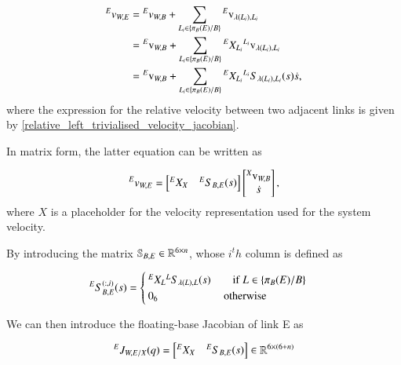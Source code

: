 \begin{equation}
    \begin{split}
        {}^{E}{v}_{W,E} &= {}^{E}{v}_{W,B} + \sum_{L_i \in \{\pi_B(E)/B\}} {}^{E}{\text{v}}_{\lambda(L_i), L_i}\\
        &= {}^{E}{\text{v}}_{W,B} + \sum_{L_i \in \{\pi_B(E)/B\}} {}^{E}{X}_{L_i}{}^{L_i}{\text{v}}_{\lambda(L_i), L_i}\\
        &= {}^{E}{\text{v}}_{W,B} + \sum_{L_i \in \{\pi_B(E)/B\}} {}^{E}{X}_{L_i}{}^{L_i}{S}_{\lambda(L_i), L_i}(s)\dot{s},
    \end{split}
\end{equation}
where the expression for the relative velocity between two adjacent links is given by \ref{relative_left_trivialised_velocity_jacobian}.

In matrix form, the latter equation can be written as

\begin{equation}\label{velocity_link_world_frame_matrix}
    {}^{E}{v}_{W,E} =
    \begin{bmatrix}
        {}^{E}{X}_{X} & {}^{E}{S}_{B,E}(s)
    \end{bmatrix}
    \begin{bmatrix}
        {}^{X}{\text{v}}_{W,B}\\
        \dot{s}
    \end{bmatrix},
\end{equation}
where $X$ is a placeholder for the velocity representation used for the system velocity.

By introducing the matrix $\mathbb{S}_{B,E}\in \mathbb{R}^{6\times n}$, whose $i^th$ column is defined as

\begin{equation}\label{joint_motion_subspace_matrix}
    {}^{E}{S}_{B,E}^{(:,i)}(s) =
    \begin{cases}
        {}^{E}{X}_{L}{}^{L}{S}_{\lambda(L),L}(s) \qquad\text{if}\;L\in \{ \pi_B(E)/B \}\\
        0_6\qquad\qquad\qquad\text{otherwise}
    \end{cases}
\end{equation}

We can then introduce the floating-base Jacobian of link E as

\begin{equation}\label{floating_base_jacobian}
    {}^{E}{J}_{W,E/X}(q) = 
    \begin{bmatrix}
        {}^{E}{X}_{X} & {}^{E}{S}_{B,E}(s)
    \end{bmatrix} \in \mathbb{R}^{6\times (6+n)}
\end{equation}

